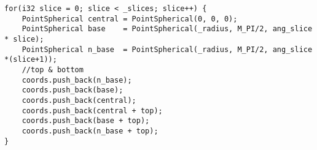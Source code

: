\begin{lstlisting}
for(i32 slice = 0; slice < _slices; slice++) {
    PointSpherical central = PointSpherical(0, 0, 0);
    PointSpherical base    = PointSpherical(_radius, M_PI/2, ang_slice * slice);
    PointSpherical n_base  = PointSpherical(_radius, M_PI/2, ang_slice *(slice+1));
    //top & bottom
    coords.push_back(n_base);
    coords.push_back(base);
    coords.push_back(central);
    coords.push_back(central + top);
    coords.push_back(base + top);
    coords.push_back(n_base + top);
}
\end{lstlisting}
